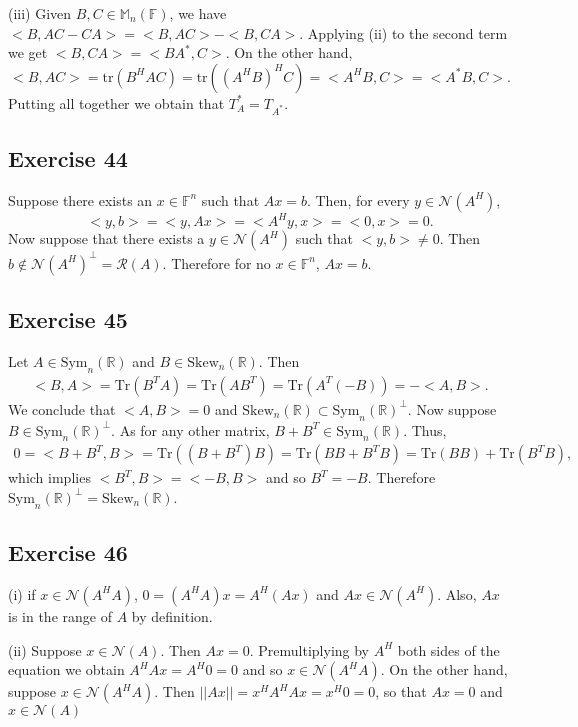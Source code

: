\documentclass[11.5pt, letterpaper, bibtotoc,
    tablecaptionabove, figurecaptionabove]{article}
\begin{document}
(iii)
Given $B,C\in\mathbb M_n(\mathbb F)$, we have $<B,AC-CA>=<B,AC>-<B,CA>$. 
Applying (ii) to the second term we get $<B,CA>=<BA^*,C>$.
On the other hand, 
\begin{equation*}
    <B,AC>=\text{tr}(B^HAC)=\text{tr}((A^HB)^HC)=<A^HB,C>=<A^*B,C>.
\end{equation*}
Putting all together we obtain that $T_A^*=T_{A^*}$.

\subsection*{Exercise 44}
Suppose there exists an $x\in\mathbb F^n$ such that $Ax=b$.
Then, for every $y\in\mathcal N(A^H)$, 
$$<y,b>=<y,Ax>=<A^Hy,x>=<0,x>=0.$$
Now suppose that there exists a $y\in\mathcal N(A^H)$ such that $<y,b>\neq0$.
Then $b\notin\mathcal N(A^H)^\perp=\mathcal R(A)$.
Therefore for no $x\in\mathbb F^n$, $Ax=b$.

\subsection*{Exercise 45}
Let $A\in\text{Sym}_n(\mathbb R)$ and $B\in\text{Skew}_n(\mathbb R)$.
Then 
\begin{align*}
    <B,A>=\text{Tr}(B^TA)=\text{Tr}(AB^T)=
    \text{Tr}(A^T(-B))=-<A,B>.
\end{align*}
We conclude that $<A,B>=0$ and $\text{Skew}_n(\mathbb R)\subset\text{Sym}_n(\mathbb R)^\perp$.
Now suppose $B\in\text{Sym}_n(\mathbb R)^\perp$.
As for any other matrix, $B+B^T\in\text{Sym}_n(\mathbb R)$.
Thus,
\begin{align*}
    0 = <B+B^T,B>=\text{Tr}((B+B^T)B) =\text{Tr}(BB + B^TB)=
    \text{Tr}(BB)+\text{Tr}(B^TB),
\end{align*}
which implies $<B^T,B>=<-B,B>$ and so $B^T=-B$.
Therefore $\text{Sym}_n(\mathbb R)^\perp=\text{Skew}_n(\mathbb R)$.

\subsection*{Exercise 46}
(i)
if $x\in\mathcal N(A^HA)$, $0=(A^HA)x=A^H(Ax)$ and $Ax\in\mathcal N(A^H)$.
Also, $Ax$ is in the range of $A$ by definition.

(ii)
Suppose $x\in\mathcal N(A)$.
Then $Ax=0$.
Premultiplying by $A^H$ both sides of the equation we obtain $A^HAx=A^H0=0$
and so $x\in\mathcal N(A^HA)$.
On the other hand, suppose $x\in\mathcal N(A^HA)$.
Then $||Ax||=x^HA^HAx=x^H0=0$, so that $Ax=0$ and $x\in\mathcal N(A)$
\end{document}
